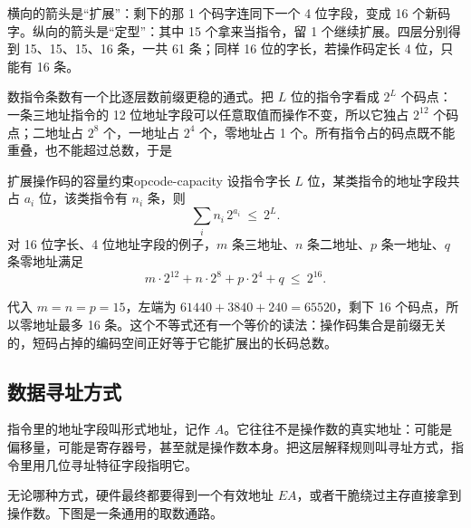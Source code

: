横向的箭头是“扩展”：剩下的那 1 个码字连同下一个 4 位字段，变成 16 个新码字。纵向的箭头是“定型”：其中 15 个拿来当指令，留 1 个继续扩展。四层分别得到 15、15、15、16 条，一共 61 条；同样 16 位的字长，若操作码定长 4 位，只能有 16 条。

数指令条数有一个比逐层数前缀更稳的通式。把 $L$ 位的指令字看成 $2^L$ 个码点：一条三地址指令的 12 位地址字段可以任意取值而操作不变，所以它独占 $2^{12}$ 个码点；二地址占 $2^8$ 个，一地址占 $2^4$ 个，零地址占 1 个。所有指令占的码点既不能重叠，也不能超过总数，于是

\begin{conclusion}{扩展操作码的容量约束}{opcode-capacity}
设指令字长 $L$ 位，某类指令的地址字段共占 $a_i$ 位，该类指令有 $n_i$ 条，则
\[
\sum_i n_i\,2^{a_i}\ \leqslant\ 2^{L}.
\]
对 16 位字长、4 位地址字段的例子，$m$ 条三地址、$n$ 条二地址、$p$ 条一地址、$q$ 条零地址满足
\[
m\cdot 2^{12}+n\cdot 2^{8}+p\cdot 2^{4}+q\ \leqslant\ 2^{16}.
\]
\end{conclusion}

代入 $m=n=p=15$，左端为 $61440+3840+240=65520$，剩下 16 个码点，所以零地址最多 16 条。这个不等式还有一个等价的读法：操作码集合是前缀无关的，短码占掉的编码空间正好等于它能扩展出的长码总数。

\subsection{数据寻址方式}

指令里的地址字段叫形式地址，记作 $A$。它往往不是操作数的真实地址：可能是偏移量，可能是寄存器号，甚至就是操作数本身。把这层解释规则叫寻址方式，指令里用几位寻址特征字段指明它。

无论哪种方式，硬件最终都要得到一个有效地址 $EA$，或者干脆绕过主存直接拿到操作数。下图是一条通用的取数通路。

